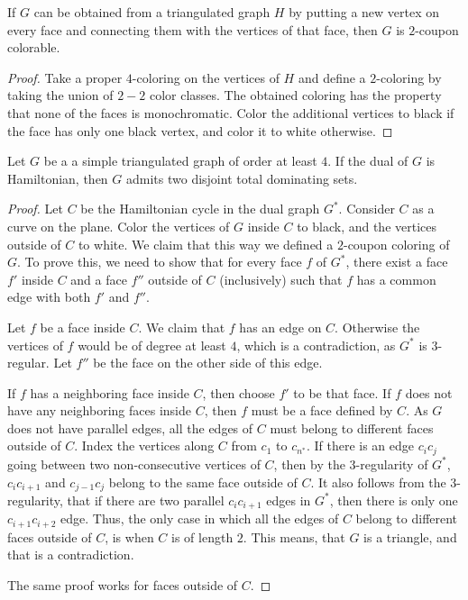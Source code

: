 \begin{claim}
  If $G$ can be obtained from a triangulated graph $H$ by putting a new vertex on every
  face and connecting them with the vertices of that face, then $G$ is $2$-coupon
  colorable.
\end{claim}
\begin{proof}
  Take a proper $4$-coloring on the vertices of $H$ and define a $2$-coloring by taking
  the union of $2-2$ color classes. The obtained coloring has the property that
  none of the faces is monochromatic. Color the additional vertices to black if the face
  has only one black vertex, and color it to white otherwise.
\end{proof}

\begin{claim} \label{ham_dual}
  Let $G$ be a a simple triangulated graph of order at least $4$. If the dual
  of $G$ is Hamiltonian, then $G$ admits two disjoint total dominating sets.
\end{claim}
\begin{proof}
  Let $C$ be the Hamiltonian cycle in the dual graph $G^*$. Consider $C$ as a curve on the plane.
  Color the vertices of $G$ inside $C$ to black, and the vertices outside of $C$ to white.
  We claim that this way we defined a $2$-coupon coloring of $G$. To prove this, we need to show
  that for every face $f$ of $G^*$, there exist a face $f'$ inside $C$ and a face $f''$
  outside of $C$ (inclusively) such that $f$ has a common edge with both $f'$ and $f''$.

  Let $f$ be a face inside $C$. We claim that $f$ has an edge on $C$. Otherwise the
  vertices of $f$ would be of degree at least $4$, which is a contradiction, as $G^*$ is
  $3$-regular. Let $f''$ be the face on the other side of this edge.

  If $f$ has a neighboring face inside $C$, then choose $f'$ to be that face.
  If $f$ does not have any neighboring faces inside $C$, then $f$ must be a face defined by $C$.
  As $G$ does not have parallel edges, all the edges of $C$ must belong to different
  faces outside of $C$. Index the vertices along $C$ from $c_1$ to $c_{n^*}$. If there
  is an edge $c_ic_j$ going between two non-consecutive vertices of $C$, then by the $3$-regularity
  of $G^*$, $c_ic_{i+1}$ and $c_{j - 1}c_j$ belong to the same face outside of $C$. It
  also follows from the $3$-regularity, that if there are two parallel $c_ic_{i+1}$ edges in $G^*$, then
  there is only one $c_{i + 1}c_{i + 2}$ edge. Thus, the only case in which all the edges of $C$
  belong to different faces outside of $C$, is when $C$ is of length $2$. This means, that
  $G$ is a triangle, and that is a contradiction.

  The same proof works for faces outside of $C$.
\end{proof}

